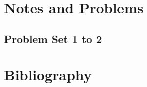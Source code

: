 \part{Notes and Problems}
   \chapter{Problem Set 1 to 2}
      
      
      
   
   
   
   
   
   

\part{Bibliography}
